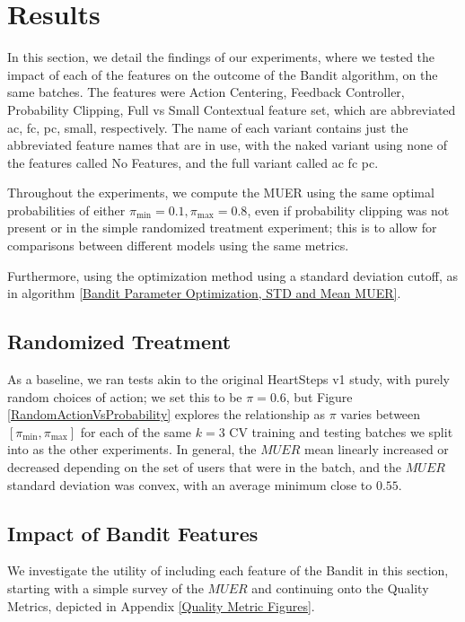 \chapter{Results}
\label{Results}

In this section, we detail the findings of our experiments, where we tested the impact of each of the features on the outcome of the Bandit algorithm, on the same batches.  The features were Action Centering, Feedback Controller, Probability Clipping, Full vs Small Contextual feature set, which are abbreviated ac, fc, pc, small, respectively.  The name of each variant contains just the abbreviated feature names that are in use, with the naked variant using none of the features called No Features, and the full variant called ac fc pc.

Throughout the experiments, we compute the MUER using the same optimal probabilities of either $\pi_\text{min} = 0.1, \pi_\text{max} = 0.8$, even if probability clipping was not present or in the simple randomized treatment experiment; this is to allow for comparisons between different models using the same metrics.

Furthermore, using the optimization method using a standard deviation cutoff, as in algorithm \ref{Bandit Parameter Optimization, STD and Mean MUER}.


\section{Randomized Treatment}

As a baseline, we ran tests akin to the original HeartSteps v1 study, with purely random choices of action; we set this to be $\pi = 0.6$, but Figure \ref{RandomActionVsProbability} explores the relationship as $\pi$ varies between $[\pi_\text{min}, \pi_\text{max}]$ for each of the same $k=3$ CV training and testing batches we split into as the other experiments.  In general, the $MUER$ mean linearly increased or decreased depending on the set of users that were in the batch, and the $MUER$ standard deviation was convex, with an average minimum close to $0.55$.

\clearpage

\section{Impact of Bandit Features}

We investigate the utility of including each feature of the Bandit in this section, starting with a simple survey of the $MUER$ and continuing onto the Quality Metrics, depicted in Appendix \ref{Quality Metric Figures}.


